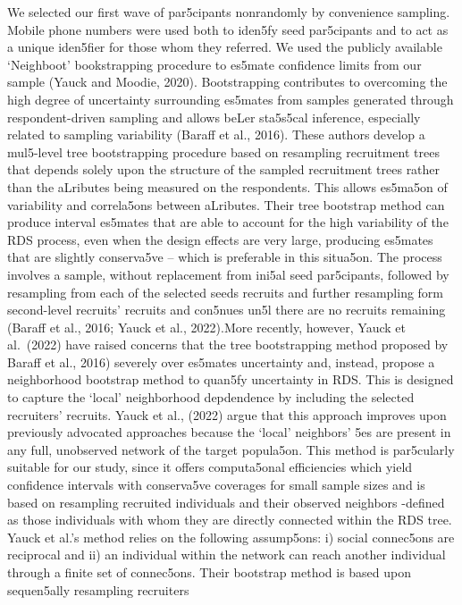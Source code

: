 \documentclass[
  12pt,
  letterpaper,
  DIV=11,
  numbers=noendperiod]{scrartcl}
\theoremstyle{plain}
\theoremstyle{definition}
\begin{document}
We selected our first wave of par5cipants nonrandomly by convenience
sampling. Mobile phone numbers were used both to iden5fy seed
par5cipants and to act as a unique iden5fier for those whom they
referred. We used the publicly available `Neighboot' bookstrapping
procedure to es5mate confidence limits from our sample (Yauck and
Moodie, 2020). Bootstrapping contributes to overcoming the high degree
of uncertainty surrounding es5mates from samples generated through
respondent-driven sampling and allows beLer sta5s5cal inference,
especially related to sampling variability (Baraﬀ et al., 2016). These
authors develop a mul5-level tree bootstrapping procedure based on
resampling recruitment trees that depends solely upon the structure of
the sampled recruitment trees rather than the aLributes being measured
on the respondents. This allows es5ma5on of variability and correla5ons
between aLributes. Their tree bootstrap method can produce interval
es5mates that are able to account for the high variability of the RDS
process, even when the design eﬀects are very large, producing es5mates
that are slightly conserva5ve -- which is preferable in this situa5on.
The process involves a sample, without replacement from ini5al seed
par5cipants, followed by resampling from each of the selected seeds
recruits and further resampling form second-level recruits' recruits and
con5nues un5l there are no recruits remaining (Baraﬀ et al., 2016; Yauck
et al., 2022).More recently, however, Yauck et al.~(2022) have raised
concerns that the tree bootstrapping method proposed by Baraﬀ et al.,
2016) severely over es5mates uncertainty and, instead, propose a
neighborhood bootstrap method to quan5fy uncertainty in RDS. This is
designed to capture the `local' neighborhood depdendence by including
the selected recruiters' recruits. Yauck et al., (2022) argue that this
approach improves upon previously advocated approaches because the
`local' neighbors' 5es are present in any full, unobserved network of
the target popula5on. This method is par5cularly suitable for our study,
since it oﬀers computa5onal eﬃciencies which yield confidence intervals
with conserva5ve coverages for small sample sizes and is based on
resampling recruited individuals and their observed neighbors -defined
as those individuals with whom they are directly connected within the
RDS tree. Yauck et al.'s method relies on the following assump5ons: i)
social connec5ons are reciprocal and ii) an individual within the
network can reach another individual through a finite set of connec5ons.
Their bootstrap method is based upon sequen5ally resampling recruiters
\end{document}
